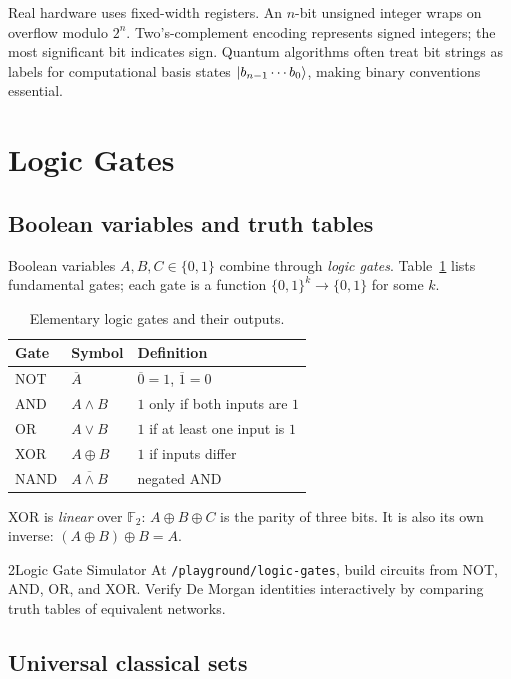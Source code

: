 Real hardware uses fixed-width registers. An $n$-bit unsigned integer wraps on overflow modulo $2^n$. Two's-complement encoding represents signed integers; the most significant bit indicates sign. Quantum algorithms often treat bit strings as labels for computational basis states $\ket{b_{n-1}\cdots b_0}$, making binary conventions essential.

\section{Logic Gates}
\label{sec:logic-gates}

\subsection{Boolean variables and truth tables}

Boolean variables $A,B,C\in\{0,1\}$ combine through \emph{logic gates}. Table~\ref{tab:basic-gates} lists fundamental gates; each gate is a function $\{0,1\}^k\to\{0,1\}$ for some $k$.

\begin{table}[H]
\centering
\caption{Elementary logic gates and their outputs.}
\label{tab:basic-gates}
\begin{tabular}{@{}lll@{}}
\toprule
Gate & Symbol & Definition \\
\midrule
NOT & $\overline{A}$ & $\overline{0}=1$, $\overline{1}=0$ \\
AND & $A\land B$ & $1$ only if both inputs are $1$ \\
OR & $A\lor B$ & $1$ if at least one input is $1$ \\
XOR & $A\oplus B$ & $1$ if inputs differ \\
NAND & $\overline{A\land B}$ & negated AND \\
\bottomrule
\end{tabular}
\end{table}

XOR is \emph{linear} over $\mathbb{F}_2$: $A\oplus B\oplus C$ is the parity of three bits. It is also its own inverse: $(A\oplus B)\oplus B = A$.

\begin{labbox}{2}{Logic Gate Simulator}
At \texttt{/playground/logic-gates}, build circuits from NOT, AND, OR, and XOR. Verify De Morgan identities interactively by comparing truth tables of equivalent networks.
\end{labbox}

\subsection{Universal classical sets}

